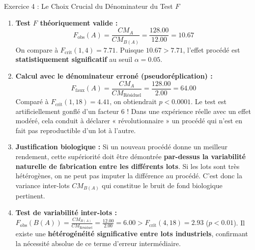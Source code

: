\documentclass[11pt,a4paper]{article}
\begin{document}
\begin{solutionbox}{Exercice 4 : Le Choix Crucial du Dénominateur du Test $F$}
\begin{enumerate}[label=\textbf{\alph*.}]
  \item \textbf{Test $F$ théoriquement valide :}
  \begin{equation*}
    F_{\text{obs}}(A) = \frac{CM_A}{CM_{B(A)}} = \frac{128.00}{12.00} = \mathbf{10.67}
  \end{equation*}
  On compare à $F_{\text{crit}}(1, 4) = 7.71$. Puisque $10.67 > 7.71$, l'effet procédé est \textbf{statistiquement significatif} au seuil $\alpha = 0.05$.

  \item \textbf{Calcul avec le dénominateur erroné (pseudoréplication) :}
  \begin{equation*}
    F_{\text{faux}}(A) = \frac{CM_A}{CM_{\text{Résiduel}}} = \frac{128.00}{2.00} = \mathbf{64.00}
  \end{equation*}
  Comparé à $F_{\text{crit}}(1, 18) = 4.41$, on obtiendrait $p < 0.0001$. Le test est artificiellement gonflé d'un facteur 6 ! Dans une expérience réelle avec un effet modéré, cela conduit à déclarer « révolutionnaire » un procédé qui n'est en fait pas reproductible d'un lot à l'autre.

  \item \textbf{Justification biologique :}
  Si un nouveau procédé donne un meilleur rendement, cette supériorité doit être démontrée \textbf{par-dessus la variabilité naturelle de fabrication entre les différents lots}. Si les lots sont très hétérogènes, on ne peut pas imputer la différence au procédé. C'est donc la variance inter-lots $CM_{B(A)}$ qui constitue le bruit de fond biologique pertinent.

  \item \textbf{Test de variabilité inter-lots :}
  $F_{\text{obs}}(B(A)) = \frac{CM_{B(A)}}{CM_{\text{Résiduel}}} = \frac{12.00}{2.00} = 6.00 > F_{\text{crit}}(4, 18) = 2.93$ ($p < 0.01$).
  Il existe une \textbf{hétérogénéité significative entre lots industriels}, confirmant la nécessité absolue de ce terme d'erreur intermédiaire.
\end{enumerate}
\end{solutionbox}
\end{document}
